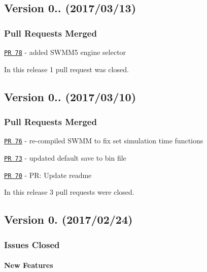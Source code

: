 \subsection*{Version 0.. (2017/03/13)}

\subsubsection*{Pull Requests Merged}


\begin{DoxyItemize}
\item \href{https://github.com/OpenWaterAnalytics/pyswmm/pull/78}{\tt PR 78} -\/ added S\+W\+M\+M5 engine selector
\end{DoxyItemize}

In this release 1 pull request was closed.

\subsection*{Version 0.. (2017/03/10)}

\subsubsection*{Pull Requests Merged}


\begin{DoxyItemize}
\item \href{https://github.com/OpenWaterAnalytics/pyswmm/pull/76}{\tt PR 76} -\/ re-\/compiled S\+W\+MM to fix set simulation time functions
\item \href{https://github.com/OpenWaterAnalytics/pyswmm/pull/73}{\tt PR 73} -\/ updated default save to bin file
\item \href{https://github.com/OpenWaterAnalytics/pyswmm/pull/70}{\tt PR 70} -\/ PR\+: Update readme
\end{DoxyItemize}

In this release 3 pull requests were closed.

\subsection*{Version 0. (2017/02/24)}

\subsubsection*{Issues Closed}

\paragraph*{New Features}


